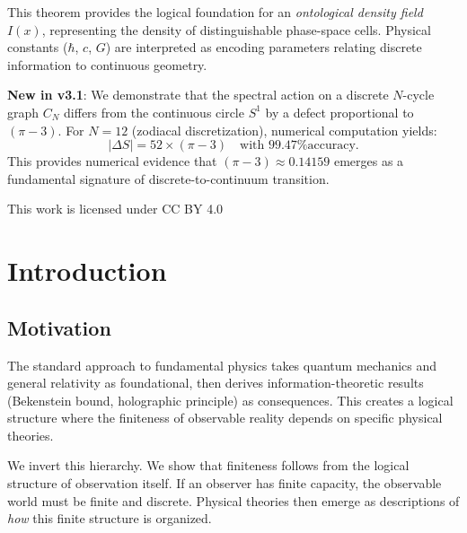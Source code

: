 \documentclass[12pt, a4paper]{article}
\begin{document}
\begin{titlepage}
\begin{tcolorbox}[colback=blue!5!white, colframe=blue!75!black, width=0.95\textwidth]
This theorem provides the logical foundation for an \emph{ontological density field} $I(x)$, representing the density of distinguishable phase-space cells. Physical constants ($\hbar$, $c$, $G$) are interpreted as encoding parameters relating discrete information to continuous geometry.

\textbf{New in v3.1}: We demonstrate that the spectral action on a discrete $N$-cycle graph $C_N$ differs from the continuous circle $S^1$ by a defect proportional to $(\pi - 3)$. For $N=12$ (zodiacal discretization), numerical computation yields:
\begin{equation*}
    |\Delta S| = 52 \times (\pi - 3) \quad \text{with 99.47\% accuracy.}
\end{equation*}
This provides numerical evidence that $(\pi - 3) \approx 0.14159$ emerges as a fundamental signature of discrete-to-continuum transition.

\end{tcolorbox}

\vfill

{\small This work is licensed under CC BY 4.0}

\end{titlepage}

\tableofcontents
\newpage


\section{Introduction}

\subsection{Motivation}

The standard approach to fundamental physics takes quantum mechanics and general relativity as foundational, then derives information-theoretic results (Bekenstein bound, holographic principle) as consequences. This creates a logical structure where the finiteness of observable reality depends on specific physical theories.

We invert this hierarchy. We show that finiteness follows from the logical structure of observation itself. If an observer has finite capacity, the observable world must be finite and discrete. Physical theories then emerge as descriptions of \emph{how} this finite structure is organized.
\end{document}
